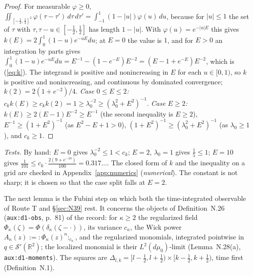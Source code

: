 \documentclass[11pt,a4paper]{article}
\newcommand{\R}{\mathbb{R}}
\newcommand{\dmu}{d\mu_0}
\theoremstyle{plain}
\theoremstyle{definition}
\begin{document}
\begin{proof}
For measurable $\varphi\ge0$, $\iint_{[-\frac12,\frac12]^2}\varphi(\tau-\tau')\,d\tau\,d\tau'
=\int_{-1}^1(1-|u|)\varphi(u)\,du$, because for $|u|\le1$ the set of $\tau$ with
$\tau,\tau-u\in[-\frac12,\frac12]$ has length $1-|u|$.  With $\varphi(u)=e^{-|u|E}$ this gives
$k(E)=2\int_0^1(1-u)e^{-uE}du$; at $E=0$ the value is $1$, and for $E>0$ an integration by parts
gives $\int_0^1(1-u)e^{-uE}du=E^{-1}-(1-e^{-E})E^{-2}=(E-1+e^{-E})E^{-2}$, which is
(\ref{eq:k}).  The integrand is positive and nonincreasing in $E$ for each $u\in[0,1)$, so $k$
is positive and nonincreasing, and continuous by dominated convergence;
$k(2)=2(1+e^{-2})/4$.  \emph{Case $0\le E\le2$:} $c_kk(E)\ge c_kk(2)=1\ge\lambda_0^{-2}\ge
(\lambda_0^2+E^2)^{-1}$.  \emph{Case $E\ge2$:} $k(E)\ge2(E-1)E^{-2}\ge E^{-1}$ (the second
inequality is $E\ge2$), $E^{-1}\ge(1+E^2)^{-1}$ (as $E^2-E+1>0$), $(1+E^2)^{-1}\ge
(\lambda_0^2+E^2)^{-1}$ (as $\lambda_0\ge1$), and $c_k\ge1$.
\end{proof}

\emph{Tests.}  By hand: $E=0$ gives $\lambda_0^{-2}\le1<c_k$; $E=2$, $\lambda_0=1$ gives
$\frac15\le1$; $E=10$ gives $\frac1{101}\le c_k\cdot\frac{2(9+e^{-10})}{100}=0.317\ldots$.  The
closed form of $k$ and the inequality on a grid are checked in Appendix~\ref{app:numerics}
(\emph{numerical}).  The constant is not sharp; it is chosen so that the case split falls at
$E=2$.

The next lemma is the Fubini step on which both the time-integrated observable of Route T and
\S\ref{sec:N39} rest.  It concerns the objects of Definition~N.26 (\texttt{aux:d1-obs},
p.~81) of the record: for $\kappa\ge2$ the regularized field
$\Phi_\kappa(\zeta)=\Phi(\delta_\kappa(\zeta-\cdot))$, its variance $c_\kappa$, the Wick power
$A_\kappa(z):={:}\Phi_\kappa(z)^n{:}_{c_\kappa}$, and the regularized monomials, integrated
pointwise in $q\in\mathcal S'(\R^2)$; the localized monomial is their $L^2(\dmu)$-limit
(Lemma~N.28(a), \texttt{aux:d1-moments}).  The squares are
$\Delta_{l,k}=[l-\frac12,l+\frac12)\times[k-\frac12,k+\frac12)$, time first (Definition~N.1).
\end{document}

